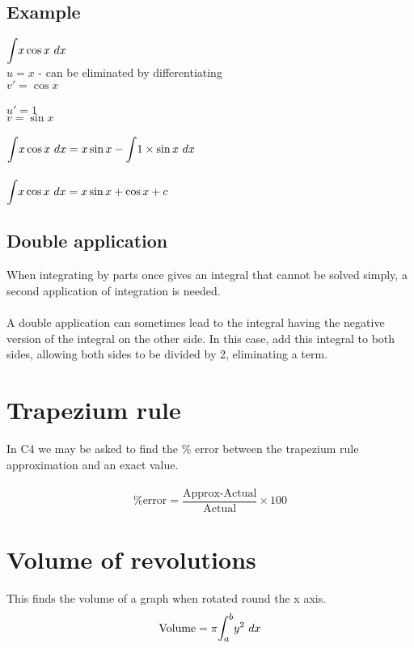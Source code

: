 \documentclass{article}[18pt]
\begin{document}
\subsection{Example}
$\mathlarger{\int}x\cos x \ dx$\\
$u=x$ - can be eliminated by differentiating\\
$v'=\cos x$\\
\\
$u'=1$\\
$v=\sin x$\\
\\
$\mathlarger{\int}x\cos x \ dx=x\sin x-\mathlarger{\int}1\times\sin x \ dx$\\
\\
$\mathlarger{\int}x\cos x \ dx=x\sin x+\cos x+c$\\
\subsection{Double application}
When integrating by parts once gives an integral that cannot be solved simply, a second application of integration is needed.\\
\\
A double application can sometimes lead to the integral having the negative version of the integral on the other side. In this case, add this integral to both sides, allowing both sides to be divided by 2, eliminating a term.
\section{Trapezium rule}
In C4 we may be asked to find the \% error between the trapezium rule approximation and an exact value.\\
\\
$$\text{\% error}=\dfrac{\text{Approx-Actual}}{\text{Actual}}\times 100$$
\section{Volume of revolutions}
This finds the volume of a graph when rotated round the x axis.\\
$$\text{Volume}=\pi\mathlarger{\int_a^b}y^2 \ dx$$
\end{document}
